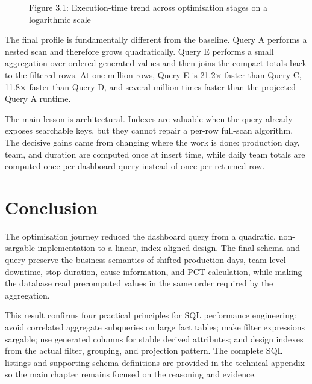 \begin{figure}[H]
\centering
{}
\caption{Figure 3.1: Execution-time trend across optimisation stages on a logarithmic scale}
\label{fig:chapter3-4}
\end{figure}

The final profile is fundamentally different from the baseline. Query A performs a nested scan and therefore grows quadratically. Query E performs a small aggregation over ordered generated values and then joins the compact totals back to the filtered rows. At one million rows, Query E is 21.2$\times$ faster than Query C, 11.8$\times$ faster than Query D, and several million times faster than the projected Query A runtime.

The main lesson is architectural. Indexes are valuable when the query already exposes searchable keys, but they cannot repair a per-row full-scan algorithm. The decisive gains came from changing where the work is done: production day, team, and duration are computed once at insert time, while daily team totals are computed once per dashboard query instead of once per returned row.

\section*{Conclusion}

The optimisation journey reduced the dashboard query from a quadratic, non-sargable implementation to a linear, index-aligned design. The final schema and query preserve the business semantics of shifted production days, team-level downtime, stop duration, cause information, and PCT calculation, while making the database read precomputed values in the same order required by the aggregation.

This result confirms four practical principles for SQL performance engineering: avoid correlated aggregate subqueries on large fact tables; make filter expressions sargable; use generated columns for stable derived attributes; and design indexes from the actual filter, grouping, and projection pattern. The complete SQL listings and supporting schema definitions are provided in the technical appendix so the main chapter remains focused on the reasoning and evidence.
